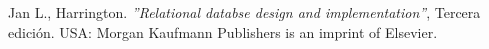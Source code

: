 \begin{thebibliography}{9}
        Jan L., Harrington. \textit{''Relational databse design and implementation''}, Tercera edición. USA: Morgan Kaufmann Publishers is an imprint of Elsevier. 
   
\begin{comment}
    
     
    \bibitem{objetivo2}
        B. Marín, J. Frez, J. Cruz-Lemus, and M. Genero. 2018.
        \textit{An Empirical Investigation on the Benefits of Gamification in Programming Courses.} ACM Trans. Comput. Educ. 19, 1, Article 4 (November 2018), 22 pages.
    
    \bibitem{arte12}
        M. García-Iruela and R. Hijón-Neira, 
        \textit{"Proposal of a management interface for gamified environments in Moodle,"} 2018 International Symposium on Computers in Education (SIIE), Jerez, 2018, p. 2.
        
    \bibitem{octa1}
        Matos, P. F. (2018). 
        \textit{Gamification–The power of motivation using Octalysis Framework} (Bachelor's thesis).        
        
    \bibitem{octa2}
        Dicheva, D., Dichev, C., Agre, G., \& Angelova, G. (2015). 
        \textit{Gamification in Education: A Systematic Mapping Study.} 
        Educational Technology \& Society, 18 (3).
    
    \bibitem{octa3}
        Sanchez-Gordón, M. L., Colomo-Palacios, R., \& Herranz, E. (2016, September). 
        \textit{Gamification and human factors in quality management systems: mapping from octalysis framework to ISO 10018.} 
        In European Conference on Software Process Improvement (pp. 234-241). Springer, Cham.
    
    \bibitem{octa4}
        Ewais, S., \& Alluhaidan, A. (2015). 
        \textit{Classification of stress management mHealth apps based on octalysis framework.}
        
    \bibitem{octa5}
        Cabrera, W. R. R., \& Pech, S. H. Q. 
        \textit{Aprendizaje en un Ambiente Virtual a Través de la Gamificación: Una experiencia en una Universidad en México.}
        Tecnologías y Aprendizaje, 508.
        
    
    
    
    
    
\end{comment}   
\end{thebibliography}
